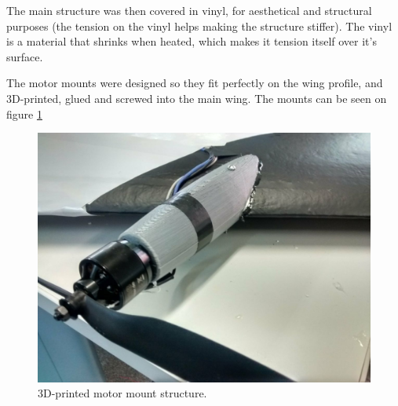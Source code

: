 The main structure was then covered in vinyl, for aesthetical and structural purposes (the tension on the vinyl helps making the structure stiffer). The vinyl is a material that shrinks when heated, which makes it tension itself over it's surface.

The motor mounts were designed so they fit perfectly on the wing profile, and 3D-printed, glued and screwed into the main wing.
The mounts can be seen on figure \ref{fig:motormount}


\begin{figure}[H]
\centering
  \includegraphics[width=\linewidth]{figs/3dprintedmount.png}
  \caption{3D-printed motor mount structure.}
  \label{fig:motormount}
\end{figure}
	
	
	

